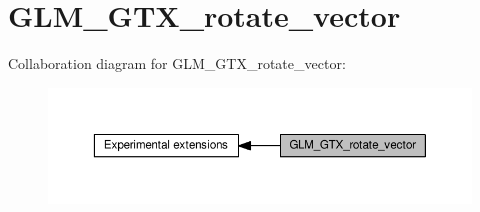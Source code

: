 \hypertarget{group__gtx__rotate__vector}{}\section{G\+L\+M\+\_\+\+G\+T\+X\+\_\+rotate\+\_\+vector}
\label{group__gtx__rotate__vector}
Collaboration diagram for G\+L\+M\+\_\+\+G\+T\+X\+\_\+rotate\+\_\+vector\+:
\nopagebreak
\begin{figure}[H]
\begin{center}
\leavevmode
\includegraphics[width=350pt]{df/d02/group__gtx__rotate__vector}
\end{center}
\end{figure}
